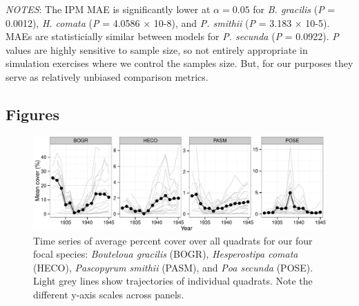 \documentclass[12pt,]{article}
\begin{document}
\emph{NOTES}: The IPM MAE is significantly lower at $\alpha=0.05$ for
\emph{B. gracilis} (\emph{P} = 0.0012), \emph{H. comata} (\emph{P} =
4.0586 × 10-8), and \emph{P. smithii} (\emph{P} = 3.183 × 10-5). MAEs
are statisticially similar between models for \emph{P. secunda}
(\emph{P} = 0.0922). \emph{P} values are highly sensitive to sample
size, so not entirely appropriate in simulation exercises where we
control the samples size. But, for our purposes they serve as relatively
unbiased comparison metrics.

\pagebreak{}

\pagebreak{}

\subsection{Figures}\label{figures}

\begin{figure}[htbp]
\centering
\includegraphics{components/figure/manuscript-figure_1.pdf}
\caption{Time series of average percent cover over all quadrats for our
four focal species: \emph{Bouteloua gracilis} (BOGR), \emph{Hesperostipa
comata} (HECO), \emph{Pascopyrum smithii} (PASM), and \emph{Poa secunda}
(POSE). Light grey lines show trajectories of individual quadrats. Note
the different y-axis scales across panels.}
\end{figure}
\end{document}
